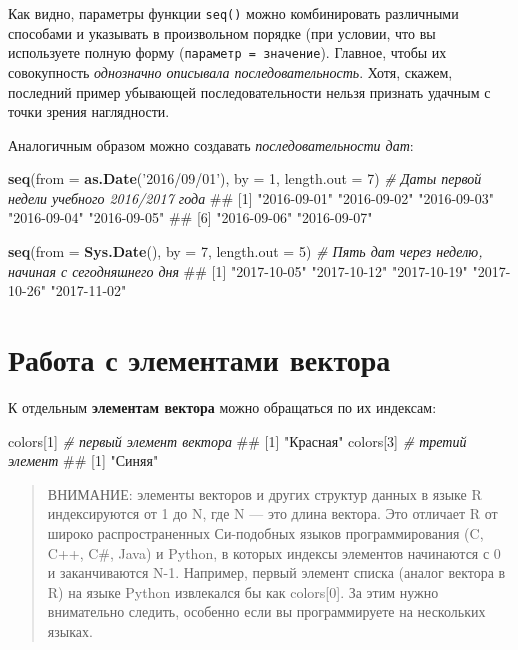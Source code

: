 \documentclass[]{book}
\newenvironment{Shaded}{\begin{snugshade}}{\end{snugshade}}
\newcommand{\KeywordTok}[1]{\textcolor[rgb]{0.13,0.29,0.53}{\textbf{#1}}}
\newcommand{\DataTypeTok}[1]{\textcolor[rgb]{0.13,0.29,0.53}{#1}}
\newcommand{\DecValTok}[1]{\textcolor[rgb]{0.00,0.00,0.81}{#1}}
\newcommand{\StringTok}[1]{\textcolor[rgb]{0.31,0.60,0.02}{#1}}
\newcommand{\CommentTok}[1]{\textcolor[rgb]{0.56,0.35,0.01}{\textit{#1}}}
\newcommand{\NormalTok}[1]{#1}
\begin{document}
Как видно, параметры функции \texttt{seq()} можно комбинировать
различными способами и указывать в произвольном порядке (при условии,
что вы используете полную форму (\texttt{параметр\ =\ значение}).
Главное, чтобы их совокупность \emph{однозначно описывала
последовательность}. Хотя, скажем, последний пример убывающей
последовательности нельзя признать удачным с точки зрения наглядности.

Аналогичным образом можно создавать \emph{последовательности дат}:

\begin{Shaded}
\begin{Highlighting}[]
\KeywordTok{seq}\NormalTok{(}\DataTypeTok{from =} \KeywordTok{as.Date}\NormalTok{(}\StringTok{'2016/09/01'}\NormalTok{), }\DataTypeTok{by =} \DecValTok{1}\NormalTok{, }\DataTypeTok{length.out =} \DecValTok{7}\NormalTok{) }\CommentTok{# Даты первой недели учебного 2016/2017 года}
\NormalTok{## [1] "2016-09-01" "2016-09-02" "2016-09-03" "2016-09-04" "2016-09-05"}
\NormalTok{## [6] "2016-09-06" "2016-09-07"}

\KeywordTok{seq}\NormalTok{(}\DataTypeTok{from =} \KeywordTok{Sys.Date}\NormalTok{(), }\DataTypeTok{by =} \DecValTok{7}\NormalTok{, }\DataTypeTok{length.out =} \DecValTok{5}\NormalTok{) }\CommentTok{# Пять дат через неделю, начиная с сегодняшнего дня}
\NormalTok{## [1] "2017-10-05" "2017-10-12" "2017-10-19" "2017-10-26" "2017-11-02"}
\end{Highlighting}
\end{Shaded}

\section{Работа с элементами вектора}\label{vector_elements}

К отдельным \textbf{элементам вектора} можно обращаться по их индексам:

\begin{Shaded}
\begin{Highlighting}[]
\NormalTok{colors[}\DecValTok{1}\NormalTok{] }\CommentTok{# первый элемент вектора}
\NormalTok{## [1] "Красная"}
\NormalTok{colors[}\DecValTok{3}\NormalTok{] }\CommentTok{# третий элемент}
\NormalTok{## [1] "Синяя"}
\end{Highlighting}
\end{Shaded}

\begin{quote}
ВНИМАНИЕ: элементы векторов и других структур данных в языке R
индексируются от 1 до N, где N --- это длина вектора. Это отличает R от
широко распространенных Си-подобных языков программирования (C, C++,
C\#, Java) и Python, в которых индексы элементов начинаются с 0 и
заканчиваются N-1. Например, первый элемент списка (аналог вектора в R)
на языке Python извлекался бы как colors{[}0{]}. За этим нужно
внимательно следить, особенно если вы программируете на нескольких
языках.
\end{quote}
\end{document}
